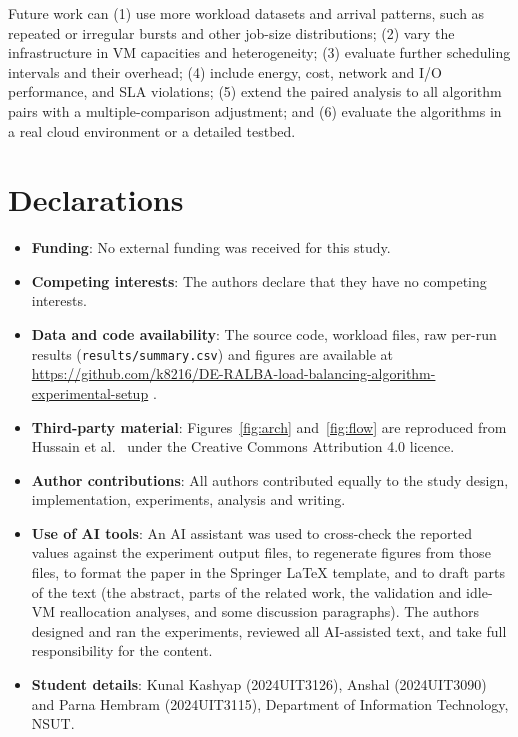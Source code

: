 \documentclass[default,sn-mathphys,Numbered]{sn-jnl}
\newcommand{\repourl}{https://github.com/k8216/DE-RALBA-load-balancing-algorithm-experimental-setup}
\begin{document}
Future work can (1) use more workload datasets and arrival patterns, such as repeated or irregular bursts and other job-size distributions; (2) vary the infrastructure in VM capacities and heterogeneity; (3) evaluate further scheduling intervals and their overhead; (4) include energy, cost, network and I/O performance, and SLA violations; (5) extend the paired analysis to all algorithm pairs with a multiple-comparison adjustment; and (6) evaluate the algorithms in a real cloud environment or a detailed testbed.

\section*{Declarations}
\begin{itemize}
    \item \textbf{Funding}: No external funding was received for this study.
    \item \textbf{Competing interests}: The authors declare that they have no competing interests.
    \item \textbf{Data and code availability}: The source code, workload files, raw per-run results (\texttt{results/summary.csv}) and figures are available at \url{\repourl} \cite{spikelb2026repo}.
    \item \textbf{Third-party material}: Figures~\ref{fig:arch} and~\ref{fig:flow} are reproduced from Hussain et al.\ \cite{hussain2025deralba} under the Creative Commons Attribution 4.0 licence.
    \item \textbf{Author contributions}: All authors contributed equally to the study design, implementation, experiments, analysis and writing.
    \item \textbf{Use of AI tools}: An AI assistant was used to cross-check the reported values against the experiment output files, to regenerate figures from those files, to format the paper in the Springer LaTeX template, and to draft parts of the text (the abstract, parts of the related work, the validation and idle-VM reallocation analyses, and some discussion paragraphs). The authors designed and ran the experiments, reviewed all AI-assisted text, and take full responsibility for the content.
    \item \textbf{Student details}: Kunal Kashyap (2024UIT3126), Anshal (2024UIT3090) and Parna Hembram (2024UIT3115), Department of Information Technology, NSUT.
\end{itemize}


\end{document}
